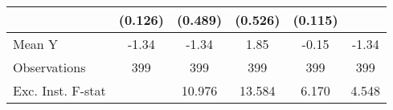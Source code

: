 {\begin{tabular}{l*{5}{c}}
            &     (0.126)         &     (0.489)         &     (0.526)         &     (0.115)         &                     \\
\midrule
Mean Y      &       -1.34         &       -1.34         &        1.85         &       -0.15         &       -1.34         \\
Observations&         399         &         399         &         399         &         399         &         399         \\
Exc. Inst. F-stat&                     &      10.976         &      13.584         &       6.170         &       4.548         \\
\bottomrule
\end{tabular}
}
